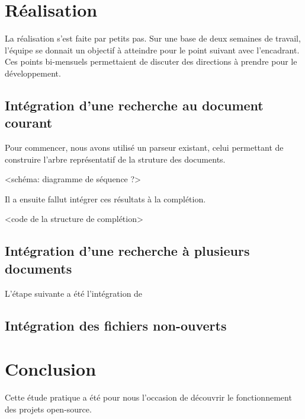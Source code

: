\documentclass[a4paper,11pt]{report}
\begin{document}

\chapter{Réalisation}
La réalisation s'est faite par petits pas. Sur une base de deux semaines de travail, l'équipe se donnait un objectif à atteindre pour le point suivant avec l'encadrant.
Ces points bi-mensuels permettaient de discuter des directions à prendre pour le développement.

\section{Intégration d'une recherche au document courant}
Pour commencer, nous avons utilisé un parseur existant, celui permettant de construire l'arbre représentatif de la struture des documents.

<schéma: diagramme de séquence ?>

Il a ensuite fallut intégrer ces résultats à la complétion.

<code de la structure de complétion> 

\section{Intégration d'une recherche à plusieurs documents}

L'étape suivante a été l'intégration de 

\section{Intégration des fichiers non-ouverts}

\chapter{Conclusion}
Cette étude pratique a été pour nous l'occasion de découvrir le fonctionnement des projets open-source.
\end{document}
